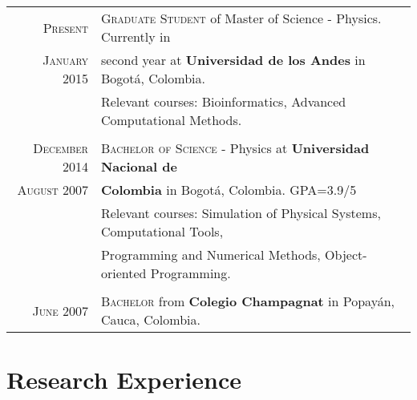 \documentclass[a4paper,10pt]{article} %
\begin{document}
\begin{tabular}{rl}	

\textsc{Present} & \textsc{Graduate Student} of Master of Science - Physics. Currently in \\ \textsc{January 2015} & second year at \textbf{Universidad de los Andes} in Bogot\'a, Colombia. \\
& Relevant courses: Bioinformatics, Advanced Computational Methods. \\
\\
\textsc{December 2014} & \textsc{Bachelor of Science} - Physics at \textbf{Universidad Nacional de}  \\ \textsc{August 2007} & \textbf{Colombia} in Bogot\'a, Colombia. GPA=3.9/5 \\
& Relevant courses: Simulation of Physical Systems, Computational Tools, \\ & Programming and Numerical Methods, Object-oriented Programming. \\
\\
\textsc{June 2007}& \textsc{}\textsc{Bachelor} from \normalsize\textbf{Colegio Champagnat} in Popay\'an, Cauca, Colombia.\\

\end{tabular}


\color{OrangeRed}
\section{Research Experience}
\color{black}
\end{document}
